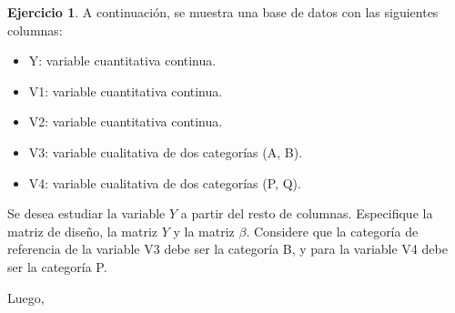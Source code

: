 \documentclass[
  11pt,
]{book}
\providecommand{\tightlist}{%
  \setlength{\itemsep}{0pt}\setlength{\parskip}{0pt}}
\theoremstyle{definition}
\theoremstyle{definition}
\theoremstyle{definition}
\newtheorem{exercise}{Ejercicio}[chapter]
\theoremstyle{definition}
\theoremstyle{remark}
\begin{document}
\begin{exercise}

A continuación, se muestra una base de datos con las siguientes columnas:

\begin{itemize}
\tightlist
\item
  Y: variable cuantitativa continua.
\item
  V1: variable cuantitativa continua.
\item
  V2: variable cuantitativa continua.
\item
  V3: variable cualitativa de dos categorías (A, B).
\item
  V4: variable cualitativa de dos categorías (P, Q).
\end{itemize}

\begin{table}[H]
\centering
{}
\end{table}

Se desea estudiar la variable \(Y\) a partir del resto de columnas. Especifique la matriz de diseño, la matriz \(Y\) y la matriz \(\beta\). Considere que la categoría de referencia de la variable V3 debe ser la categoría B, y para la variable V4 debe ser la categoría P.

Luego,


\end{exercise}
\end{document}
